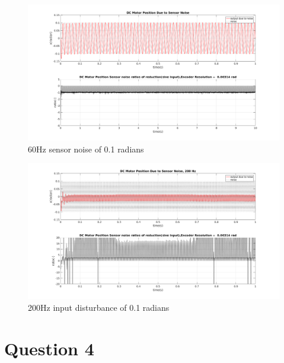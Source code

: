 \documentclass[letterpaper]{article}
\begin{document}
\begin{figure}[H]
\begin{center}
\includegraphics[scale=0.3]{position_noise_60.png}
\caption{60Hz sensor noise of 0.1 radians}
\label{q3_18}
\end{center}
\end{figure}

\begin{figure}[H]
\begin{center}
\includegraphics[scale=0.3]{position_noise_200.png}
\caption{200Hz input disturbance of 0.1 radians}
\label{q3_21}
\end{center}
\end{figure}

\clearpage

\section*{Question 4}
\end{document}
